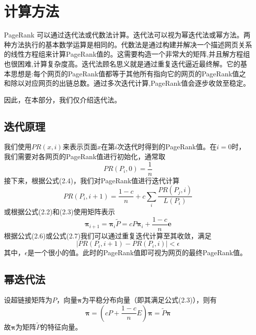 \documentclass[UTF8,openany]{ctexbook}
\begin{document}
\section[计算方法]{计算方法}

PageRank 可以通过迭代法或代数法计算。迭代法可以视为幂迭代法或幂方法。两种方法执行的基本数学运算是相同的。代数法是通过构建并解决一个描述网页关系的线性方程组来计算PageRank值的。这需要构造一个非常大的矩阵,并且解方程组也很困难,计算复杂度高。迭代法顾名思义就是通过重复迭代逼近最终解。它的基本思想是:每个网页的PageRank值都等于其他所有指向它的网页的PageRank值之和除以对应网页的出链总数。通过多次迭代计算,PageRank值会逐步收敛至稳定。

因此，在本部分，我们仅介绍迭代法。

\subsection[迭代原理]{迭代原理}

我们使用$PR(x,i)$来表示页面$x$在第$i$次迭代时得到的PageRank值。在$i=0$时，我们需要对各网页的PageRank值进行初始化，通常取
\begin{equation}
    PR(P_i,0)=\frac{1}{n}
\end{equation}
接下来，根据公式(2.4)，我们对PageRank值进行迭代计算
\begin{equation}
    PR(P_i,i+1)=\frac{1-c}{n} + c\sum_i \frac{PR(P_j, i)}{L(P_i)}
\end{equation}
或根据公式(2.2)和(2.3)使用矩阵表示
\begin{equation}
    \boldsymbol{\pi}_{i+1}=\boldsymbol{\pi}_i\widetilde{P}=cP\boldsymbol{\pi}_i+\frac{1-c}{n}\boldsymbol{e}
\end{equation}
根据公式(2.6)或公式(2.7)我们可以通过重复迭代计算至其收敛，满足
\begin{equation}
    |PR(P_i, i+1)-PR(P_i, i)|<\epsilon
\end{equation}
其中，$\epsilon$是一个很小的值。此时的PageRank值即可视为网页的最终PageRank值。

\subsection[幂迭代法]{幂迭代法}
设超链接矩阵为$P$，向量$\boldsymbol{\pi}$为平稳分布向量（即其满足公式(2.3)），则有
\begin{equation}
    \boldsymbol{\pi}=(cP+\frac{1-c}{n}E)\boldsymbol{\pi}=\widetilde{P}\boldsymbol{\pi}
\end{equation}
故$\boldsymbol{\pi}$为矩阵$\widetilde{P}$的特征向量。
\end{document}
